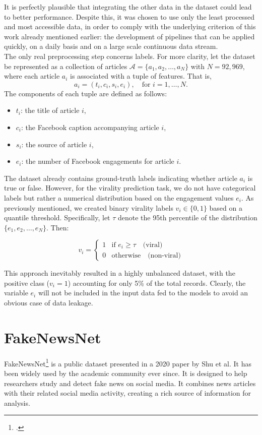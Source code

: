 \documentclass[a4paper,twoside,12pt]{book}
\begin{document}
It is perfectly plausible that integrating the other data in the dataset could lead to better performance. Despite this, it was chosen to use only the least processed and most accessible data, in order to comply with the underlying criterion of this work already mentioned earlier: the development of pipelines that can be applied quickly, on a daily basis and on a large scale continuous data stream. \\

The only real preprocessing step concerns labels. For more clarity, let the dataset be represented as a collection of articles $\mathcal{A} = \{ a_1, a_2, \dots, a_N \}$ with $N = 92{,}969$, where each article $a_i$ is associated with a tuple of features. That is,
\[
a_i = (t_i, c_i, s_i, e_i), \quad \text{for } i = 1, \dots, N.
\]
The components of each tuple are defined as follows:
\begin{itemize}
	\item $t_i$: the title of article $i$,
	\item $c_i$: the Facebook caption accompanying article $i$,
	\item $s_i$: the source of article $i$,
	\item $e_i$: the number of Facebook engagements for article $i$.
\end{itemize}

The dataset already contains ground-truth labels indicating whether article $a_i$ is true or false. However, for the virality prediction task, we do not have categorical labels but rather a numerical distribution based on the engagement values $e_i$. As previously mentioned, we created binary virality labels $v_i \in \{0,1\}$ based on a quantile threshold. Specifically, let $\tau$ denote the 95th percentile of the distribution $\{ e_1, e_2, \dots, e_N \}$. Then:

$$
v_i = 
\begin{cases}
	1 & \text{if } e_i \geq \tau \quad \text{(viral)} \\
	0 & \text{otherwise} \quad \text{(non-viral)}
\end{cases}
$$

This approach inevitably resulted in a highly unbalanced dataset, with the positive class ($v_i = 1$) accounting for only 5\% of the total records. Clearly, the variable $e_i$ will not be included in the input data fed to the models to avoid an obvious case of data leakage. \label{evons_processing}

\clearpage

\section{FakeNewsNet}
FakeNewsNet\footcite{shu2020} is a public dataset presented in a 2020 paper by Shu et al. It has been widely used by the academic community ever since. It is designed to help researchers study and detect fake news on social media. It combines news articles with their related social media activity, creating a rich source of information for analysis.
\end{document}
